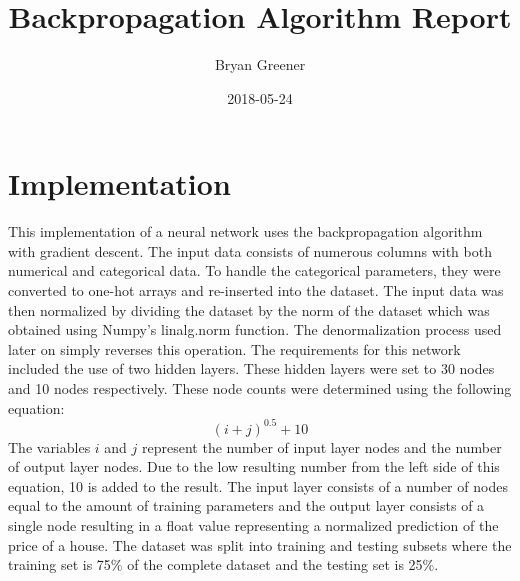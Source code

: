 \documentclass{article}
\title{Backpropagation Algorithm Report}
\author{Bryan Greener}
\date{2018-05-24}
\theoremstyle{plain} %
\theoremstyle{definition} %
\theoremstyle{plain} %
\begin{document}
\maketitle

\section*{Implementation}
This implementation of a neural network uses the backpropagation algorithm with gradient descent. The input data consists of numerous columns with both numerical and categorical data. To handle the categorical parameters, they were converted to one-hot arrays and re-inserted into the dataset. The input data was then normalized by dividing the dataset by the norm of the dataset which was obtained using Numpy's linalg.norm function. The denormalization process used later on simply reverses this operation. The requirements for this network included the use of two hidden layers. These hidden layers were set to 30 nodes and 10 nodes respectively. These node counts were determined using the following equation:
\[ (i+j)^{0.5}+10 \]
The variables $i$ and $j$ represent the number of input layer nodes and the number of output layer nodes. Due to the low resulting number from the left side of this equation, 10 is added to the result. The input layer consists of a number of nodes equal to the amount of training parameters and the output layer consists of a single node resulting in a float value representing a normalized prediction of the price of a house. The dataset was split into training and testing subsets where the training set is 75\% of the complete dataset and the testing set is 25\%. 
\end{document}
